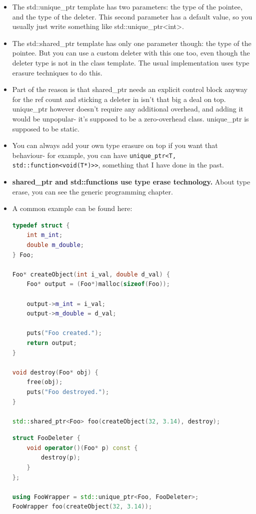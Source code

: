 \documentclass[a4paper,11pt,twoside]{book}
\begin{document}
\begin{itemize}
	\item The std::unique\_ptr template has two parameters: the type of the pointee, and the type of the deleter. This second parameter has a default value, so you usually just write something like std::unique\_ptr<int>.
	
	\item The std::shared\_ptr template has only one parameter though: the type of the pointee. But you can use a custom deleter with this one too, even though the deleter type is not in the class template. The usual implementation uses type erasure techniques to do this.
	
	\item Part of the reason is that shared\_ptr needs an explicit control block anyway for the ref count and sticking a deleter in isn't that big a deal on top. unique\_ptr however doesn't require any additional overhead, and adding it would be unpopular- it's supposed to be a zero-overhead class. unique\_ptr is supposed to be static.
	
	\item You can always add your own type erasure on top if you want that behaviour- for example, you can have \texttt{unique\_ptr<T, std::function<void(T*)>>}, something that I have done in the past.
	
	\item \textbf{shared\_ptr and std::functions use type erase technology.} About type erase, you can see the generic programming chapter.
	
	\item A common example can be found here:
\begin{lstlisting}[frame=single, language=c++]
typedef struct {
	int m_int;
	double m_double;
} Foo;
	
Foo* createObject(int i_val, double d_val) {
	Foo* output = (Foo*)malloc(sizeof(Foo));
	
	output->m_int = i_val;
	output->m_double = d_val;
	
	puts("Foo created.");
	return output;
}
	
void destroy(Foo* obj) {
	free(obj);
	puts("Foo destroyed.");        
}
	
std::shared_ptr<Foo> foo(createObject(32, 3.14), destroy);
\end{lstlisting}
	
\begin{lstlisting}[frame=single, language=c++]
struct FooDeleter {
	void operator()(Foo* p) const {
		destroy(p);
	}
};
	
using FooWrapper = std::unique_ptr<Foo, FooDeleter>;
FooWrapper foo(createObject(32, 3.14));
\end{lstlisting}
\end{itemize}
\end{document}
